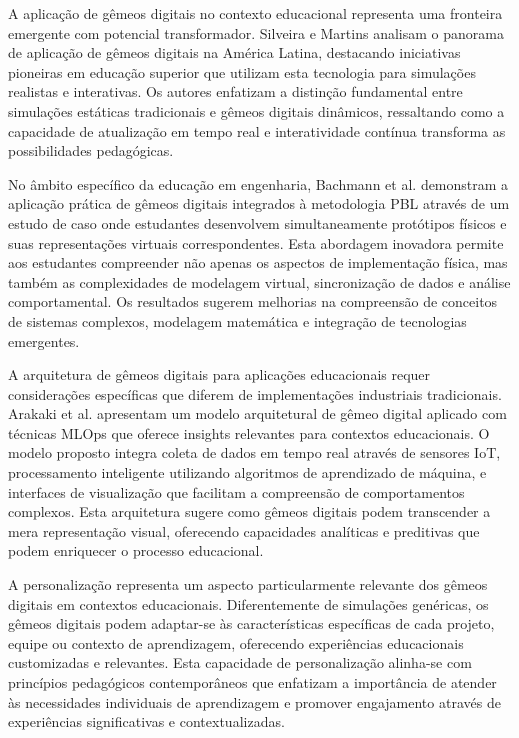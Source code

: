 \documentclass[12pt,a4paper]{article}
\begin{document}
A aplicação de gêmeos digitais no contexto educacional representa uma fronteira emergente com potencial transformador. Silveira e Martins \cite{silveira2024panorama} analisam o panorama de aplicação de gêmeos digitais na América Latina, destacando iniciativas pioneiras em educação superior que utilizam esta tecnologia para simulações realistas e interativas. Os autores enfatizam a distinção fundamental entre simulações estáticas tradicionais e gêmeos digitais dinâmicos, ressaltando como a capacidade de atualização em tempo real e interatividade contínua transforma as possibilidades pedagógicas.

No âmbito específico da educação em engenharia, Bachmann et al. \cite{bachmann2023} demonstram a aplicação prática de gêmeos digitais integrados à metodologia PBL através de um estudo de caso onde estudantes desenvolvem simultaneamente protótipos físicos e suas representações virtuais correspondentes. Esta abordagem inovadora permite aos estudantes compreender não apenas os aspectos de implementação física, mas também as complexidades de modelagem virtual, sincronização de dados e análise comportamental. Os resultados sugerem melhorias na compreensão de conceitos de sistemas complexos, modelagem matemática e integração de tecnologias emergentes.

A arquitetura de gêmeos digitais para aplicações educacionais requer considerações específicas que diferem de implementações industriais tradicionais. Arakaki et al. \cite{arakaki2022} apresentam um modelo arquitetural de gêmeo digital aplicado com técnicas MLOps que oferece insights relevantes para contextos educacionais. O modelo proposto integra coleta de dados em tempo real através de sensores IoT, processamento inteligente utilizando algoritmos de aprendizado de máquina, e interfaces de visualização que facilitam a compreensão de comportamentos complexos. Esta arquitetura sugere como gêmeos digitais podem transcender a mera representação visual, oferecendo capacidades analíticas e preditivas que podem enriquecer o processo educacional.

A personalização representa um aspecto particularmente relevante dos gêmeos digitais em contextos educacionais. Diferentemente de simulações genéricas, os gêmeos digitais podem adaptar-se às características específicas de cada projeto, equipe ou contexto de aprendizagem, oferecendo experiências educacionais customizadas e relevantes. Esta capacidade de personalização alinha-se com princípios pedagógicos contemporâneos que enfatizam a importância de atender às necessidades individuais de aprendizagem e promover engajamento através de experiências significativas e contextualizadas.
\end{document}
